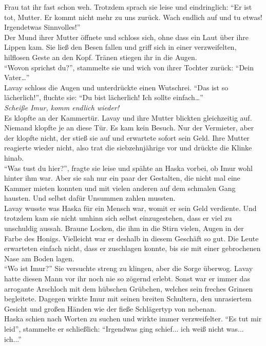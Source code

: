 Frau tat ihr fast schon weh. Trotzdem sprach sie leise und eindringlich: ``Er ist tot, Mutter. Er 
kommt nicht mehr zu uns zurück. Wach endlich auf und tu etwas! Irgendetwas Sinnvolles!''\\
Der Mund ihrer Mutter öffnete und schloss sich, ohne dass ein Laut über ihre Lippen kam. Sie ließ 
den Besen fallen und griff sich in einer verzweifelten, hilflosen Geste an den Kopf. Tränen stiegen 
ihr in die Augen. \\
``Wovon sprichst du?'', stammelte sie und wich von ihrer Tochter zurück: ``Dein Vater…''\\
Lavay schloss die Augen und unterdrückte einen Wutschrei. ``Das ist so lächerlich!'', fluchte sie: 
``Du bist lächerlich! Ich sollte einfach…''\\
\textit{Scheiße Imur, komm endlich wieder!}\\
Es klopfte an der Kammertür. Lavay und ihre Mutter blickten gleichzeitig auf. Niemand klopfte je an 
diese Tür. Es kam kein Besuch. Nur der Vermieter, aber der klopfte nicht, der stieß sie auf und 
erwartete sofort sein Geld. Ihre Mutter reagierte wieder nicht, also trat die siebzehnjährige vor 
und drückte die Klinke hinab. \\
``Was tust du hier?'', fragte sie leise und spähte an Haska vorbei, ob Imur wohl hinter ihm war. 
Aber sie sah nur ein paar der Gestalten, die nicht mal eine Kammer mieten konnten und mit vielen 
anderen auf dem schmalen Gang hausten. Und selbst dafür Unsummen zahlen mussten. \\
Lavay wusste was Haska für ein Mensch war, womit er sein Geld verdiente. Und trotzdem kam sie nicht 
umhinn sich selbst einzugestehen, dass er viel zu unschuldig aussah. Braune Locken, die ihm in die 
Stirn vielen, Augen in der Farbe des Honigs. Vielleicht war er deshalb in diesem Geschäft so gut. 
Die Leute erwarteten einfach nicht, dass er zuschlagen konnte, bis sie mit einer gebrochenen Nase 
am Boden lagen. \\
``Wo ist Imur?'' Sie versuchte streng zu klingen, aber die Sorge überwog. Lavay hatte diesen Mann 
vor ihr noch nie so zögernd erlebt. Sonst war er immer das arrogante Arschloch mit dem hübschen 
Grübchen, welches sein freches Grinsen begleitete. Dagegen wirkte Imur mit seinen breiten 
Schultern, den unrasiertem Gesicht und großen Händen wie der fieße Schlägertyp von nebenan. \\
Haska schien nach Worten zu suchen und wirkte immer verzweifelter. ``Es tut mir leid'', stammelte 
er schließlich: ``Irgendwas ging schief... ich weiß nicht was... ich...''\\
